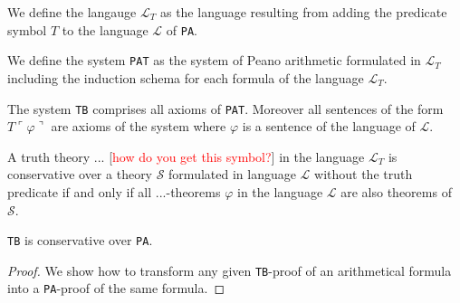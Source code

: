 %

\begin{definition}[$\mathcal{L}_T$]
    \label{def:LT}
    We define the langauge $\mathcal{L}_T$ as the language resulting from adding the predicate symbol $T$ to the language $\mathcal{L}$ of \texttt{PA}. 
\end{definition}

\begin{definition}
    \label{def:PAT}
    We define the system \texttt{PAT} as the system of Peano arithmetic formulated in $\mathcal{L}_T$ including the induction schema for each formula of the language $\mathcal{L}_T$.
\end{definition}

\begin{definition}[\texttt{TB}]
    \label{def:TB}
    The system \texttt{TB} comprises all axioms of \texttt{PAT}. Moreover all sentences of the form $T\ulcorner\varphi\urcorner$ are axioms of the system where $\varphi$ is a sentence of the language of $\mathcal{L}$.
\end{definition}

\begin{definition}[conservativity]
    \label{def:cons}
    A truth theory $...$ [\textcolor{red}{how do you get this symbol?}] in the language $\mathcal{L}_T$ is conservative over a theory $\mathcal{S}$ formulated in language $\mathcal{L}$ without the truth predicate if and only if all $...$-theorems $\varphi$ in the language $\mathcal{L}$ are also theorems of $\mathcal{S}$.
\end{definition}

\begin{theorem}
    \label{thm:tb-cons}
    \texttt{TB} is conservative over \texttt{PA}.
\end{theorem}

\begin{proof}   We show how to transform any given \texttt{TB}-proof of an arithmetical formula into a \texttt{PA}-proof of the same formula. 

\end{proof}
